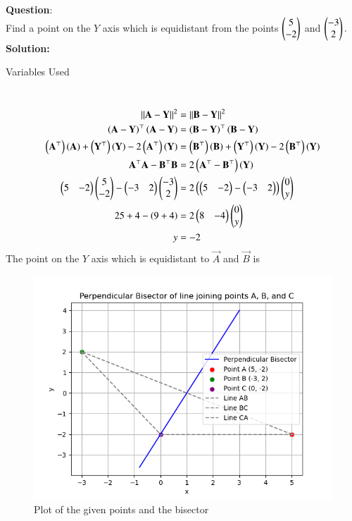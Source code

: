 \documentclass[journal]{IEEEtran}
\begin{document}
\textbf{Question}:\\
Find a point on the $Y$ axis which is equidistant from the points  $\begin{pmatrix}5\\-2\end{pmatrix}$ and $\begin{pmatrix}-3\\2\end{pmatrix}.$
\\
\textbf{Solution: }
\begin{table}[h!]    
  \centering
  
  \caption{Variables Used}
  \label{tab10.5.3.9.1}
\end{table}\\
\begin{align}
\left\lVert\mathbf{A}-\mathbf{Y}\right\rVert^2&=\left\lVert\mathbf{B}-\mathbf{Y}\right\rVert^2\\
	\left(\mathbf{A}-\mathbf{Y}\right)^\top\left(\mathbf{A}-\mathbf{Y}\right)&=\left(\mathbf{B}-\mathbf{Y}\right)^\top\left(\mathbf{B}-\mathbf{Y}\right)\\
	\left(\mathbf{A}^\top\right)\left(\mathbf{A}\right)+\left(\mathbf{Y}^\top\right)\left(\mathbf{Y}\right)-2\left(\mathbf{A}^\top\right)\left(\mathbf{Y}\right)&=\left(\mathbf{B}^\top\right)\left(\mathbf{B}\right)+\left(\mathbf{Y}^\top\right)\left(\mathbf{Y}\right)-2\left(\mathbf{B}^\top\right)\left(\mathbf{Y}\right)\\
\mathbf{{A}^\top}\mathbf{A}-\mathbf{B^\top}\mathbf{B}&=2\left(\mathbf{A}^\top-\mathbf{B}^\top\right)\left(\mathbf{Y}\right)\\
\begin{pmatrix}5&-2\end{pmatrix}\begin{pmatrix}5\\-2\end{pmatrix}-\begin{pmatrix}-3&2\end{pmatrix}\begin{pmatrix}-3\\2\end{pmatrix}&=2\left(\begin{pmatrix}5&-2\end{pmatrix}-\begin{pmatrix}-3&2\end{pmatrix}\right)\begin{pmatrix}0\\y\end{pmatrix}\\
25+4-\left(9+4\right)&=2\begin{pmatrix}8&-4\end{pmatrix}\begin{pmatrix}0\\y\end{pmatrix}\\
y&=-2
\end{align}
The point on the $Y$ axis which is equidistant to $\vec{A}$ and $\vec{B}$ is 
\begin{figure}[h!]
   \centering
   \includegraphics[width=0.7\linewidth]{figs/fig.png}
   \caption{Plot of the given points and the bisector}
\end{figure}  
\end{document}

